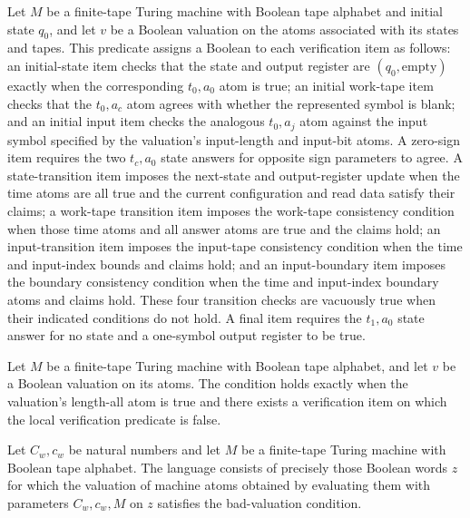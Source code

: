 \begin{definition}
\label{Complexity.Meyer.goodF}
\leanok
{}
Let $M$ be a finite-tape Turing machine with Boolean tape alphabet and initial state
$q_0$, and let $v$ be a Boolean valuation on the atoms associated with its states and
tapes. This predicate assigns a Boolean to each verification item as follows: an
initial-state item checks that the state and output register are $(q_0,\mathrm{empty})$
exactly when the corresponding $t_0,a_0$ atom is true; an initial work-tape item checks
that the $t_0,a_c$ atom agrees with whether the represented symbol is blank; and an
initial input item checks the analogous $t_0,a_j$ atom against the input symbol
specified by the valuation's input-length and input-bit atoms. A zero-sign item requires
the two $t_c,a_0$ state answers for opposite sign parameters to agree. A
state-transition item imposes the next-state and output-register update when the time
atoms are all true and the current configuration and read data satisfy their claims; a
work-tape transition item imposes the work-tape consistency condition when those time
atoms and all answer atoms are true and the claims hold; an input-transition item
imposes the input-tape consistency condition when the time and input-index bounds and
claims hold; and an input-boundary item imposes the boundary consistency condition when
the time and input-index boundary atoms and claims hold. These four transition checks
are vacuously true when their indicated conditions do not hold. A final item requires
the $t_1,a_0$ state answer for no state and a one-symbol output register to be true.
\end{definition}

\begin{definition}
\label{Complexity.Meyer.badF}
\leanok
{}
Let $M$ be a finite-tape Turing machine with Boolean tape alphabet, and let $v$ be a
Boolean valuation on its atoms. The condition holds exactly when the valuation's
length-all atom is true and there exists a verification item on which the local
verification predicate is false.
\end{definition}

\begin{definition}
\label{Complexity.Meyer.badLang}
\leanok
{}
Let $C_w,c_w$ be natural numbers and let $M$ be a finite-tape Turing machine with
Boolean tape alphabet. The language consists of precisely those Boolean words $z$ for
which the valuation of machine atoms obtained by evaluating them with parameters
$C_w,c_w,M$ on $z$ satisfies the bad-valuation condition.
\end{definition}

